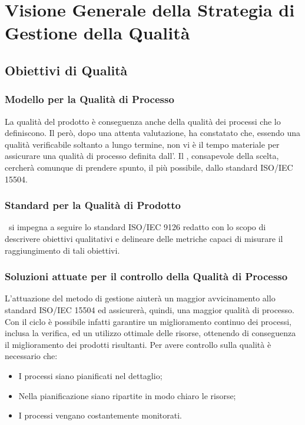 \section{Visione Generale della Strategia di Gestione della Qualità}
\subsection{Obiettivi di Qualità}
\subsubsection{Modello per la Qualità di Processo}
La qualità del prodotto è conseguenza anche della qualità dei processi che lo definiscono. Il  però, dopo una attenta valutazione, ha constatato che, essendo una qualità verificabile soltanto a lungo termine, non vi è il tempo materiale per assicurare una qualità di processo definita dall'. Il , consapevole della scelta, cercherà comunque di prendere spunto, il più possibile, dallo standard ISO/IEC 15504.

\subsubsection{Standard per la Qualità di Prodotto}
\gruppo\ si impegna a seguire lo standard ISO/IEC 9126 redatto con lo scopo di descrivere obiettivi qualitativi e delineare delle metriche capaci di misurare il raggiungimento di tali obiettivi.

\subsubsection{Soluzioni attuate per il controllo della Qualità di Processo}

L'attuazione del metodo di gestione  aiuterà un maggior avvicinamento allo standard ISO/IEC 15504 ed assicurerà, quindi, una maggior qualità di processo. Con il ciclo  è possibile infatti garantire un miglioramento continuo dei processi, inclusa la verifica, ed un utilizzo ottimale delle risorse, ottenendo di conseguenza il miglioramento dei prodotti risultanti.
Per avere controllo sulla qualità è necessario che: 
\begin{itemize}
\item
I processi siano pianificati nel dettaglio;
\item
Nella pianificazione siano ripartite in modo chiaro le risorse;
\item
I processi vengano costantemente monitorati.
\end{itemize}

